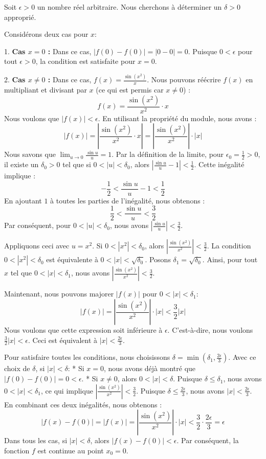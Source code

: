 \documentclass[12pt,a4paper]{report}
\begin{document}
Soit $\epsilon > 0$ un nombre réel arbitraire. Nous cherchons à déterminer un $\delta > 0$ approprié.

Considérons deux cas pour $x$:

1.  \textbf{Cas $x=0$ :}
    Dans ce cas, $|f(0) - f(0)| = |0 - 0| = 0$. Puisque $0 < \epsilon$ pour tout $\epsilon > 0$, la condition est satisfaite pour $x=0$.

2.  \textbf{Cas $x \neq 0$ :}
    Dans ce cas, $f(x) = \frac{\sin(x^2)}{x}$. Nous pouvons réécrire $f(x)$ en multipliant et divisant par $x$ (ce qui est permis car $x \neq 0$) :
    $$ f(x) = \frac{\sin(x^2)}{x^2} \cdot x $$
    Nous voulons que $|f(x)| < \epsilon$. En utilisant la propriété du module, nous avons :
    $$ |f(x)| = \left|\frac{\sin(x^2)}{x^2} \cdot x\right| = \left|\frac{\sin(x^2)}{x^2}\right| \cdot |x| $$
    Nous savons que $\lim_{u \to 0} \frac{\sin u}{u} = 1$.
    Par la définition de la limite, pour $\epsilon_0 = \frac{1}{2} > 0$, il existe un $\delta_0 > 0$ tel que si $0 < |u| < \delta_0$, alors $\left|\frac{\sin u}{u} - 1\right| < \frac{1}{2}$.
    Cette inégalité implique :
    $$ -\frac{1}{2} < \frac{\sin u}{u} - 1 < \frac{1}{2} $$
    En ajoutant $1$ à toutes les parties de l'inégalité, nous obtenons :
    $$ \frac{1}{2} < \frac{\sin u}{u} < \frac{3}{2} $$
    Par conséquent, pour $0 < |u| < \delta_0$, nous avons $\left|\frac{\sin u}{u}\right| < \frac{3}{2}$.

    Appliquons ceci avec $u = x^2$. Si $0 < |x^2| < \delta_0$, alors $\left|\frac{\sin(x^2)}{x^2}\right| < \frac{3}{2}$.
    La condition $0 < |x^2| < \delta_0$ est équivalente à $0 < |x| < \sqrt{\delta_0}$.
    Posons $\delta_1 = \sqrt{\delta_0}$.
    Ainsi, pour tout $x$ tel que $0 < |x| < \delta_1$, nous avons $\left|\frac{\sin(x^2)}{x^2}\right| < \frac{3}{2}$.

    Maintenant, nous pouvons majorer $|f(x)|$ pour $0 < |x| < \delta_1$:
    $$ |f(x)| = \left|\frac{\sin(x^2)}{x^2}\right| \cdot |x| < \frac{3}{2} |x| $$
    Nous voulons que cette expression soit inférieure à $\epsilon$. C'est-à-dire, nous voulons $\frac{3}{2} |x| < \epsilon$.
    Ceci est équivalent à $|x| < \frac{2\epsilon}{3}$.

    Pour satisfaire toutes les conditions, nous choisissons $\delta = \min\left(\delta_1, \frac{2\epsilon}{3}\right)$.
    Avec ce choix de $\delta$, si $|x| < \delta$:
    *   Si $x=0$, nous avons déjà montré que $|f(0)-f(0)| = 0 < \epsilon$.
    *   Si $x \neq 0$, alors $0 < |x| < \delta$.
        Puisque $\delta \le \delta_1$, nous avons $0 < |x| < \delta_1$, ce qui implique $\left|\frac{\sin(x^2)}{x^2}\right| < \frac{3}{2}$.
        Puisque $\delta \le \frac{2\epsilon}{3}$, nous avons $|x| < \frac{2\epsilon}{3}$.
        En combinant ces deux inégalités, nous obtenons :
        $$ |f(x) - f(0)| = |f(x)| = \left|\frac{\sin(x^2)}{x^2}\right| \cdot |x| < \frac{3}{2} \cdot \frac{2\epsilon}{3} = \epsilon $$
    Dans tous les cas, si $|x| < \delta$, alors $|f(x) - f(0)| < \epsilon$.
    Par conséquent, la fonction $f$ est continue au point $x_0 = 0$.
\end{document}
